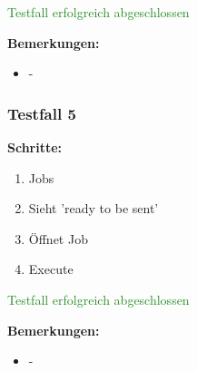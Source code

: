 \textcolor{ForestGreen}{Testfall erfolgreich abgeschlossen}

\bigskip
\textbf{Bemerkungen:}

\begin{itemize}[noitemsep,nolistsep]
    \item -
\end{itemize}

\subsubsection*{Testfall 5}

\textbf{Schritte:}

\begin{enumerate}
    \item Jobs
    \item Sieht 'ready to be sent'
    \item Öffnet Job
    \item Execute
\end{enumerate}

\textcolor{ForestGreen}{Testfall erfolgreich abgeschlossen}

\bigskip
\textbf{Bemerkungen:}

\begin{itemize}[noitemsep,nolistsep]
    \item -
\end{itemize}